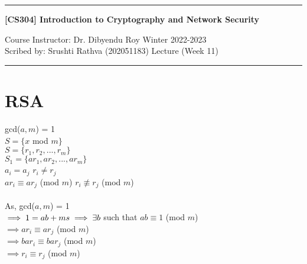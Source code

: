 \documentclass[11pt]{article}
\begin{document}
\noindent
\rule{\textwidth}{1pt}
\begin{center}
{\bf [CS304] Introduction to Cryptography and Network Security}
\end{center}
Course Instructor: Dr. Dibyendu Roy \hfill Winter 2022-2023 \\
Scribed by: Srushti Rathva (202051183) \hfill Lecture (Week 11) \\
\rule{\textwidth}{1pt}

\section*{RSA}
gcd($a,m$) = 1 \\
$S = \{x $ mod $m \}$ \\
$S = \{r_{1},r_{2},...,r_{m}\}$ \\
$S_{1} = \{ar_{1},ar_{2},...,ar_{m}\}$ \\
$a_{i} = a_{j}$ \hspace*{3cm}$r_{i} \neq r_{j}$ \\
$ar_{i} \equiv ar_{j}$ (mod $m$)  \hspace*{1cm}$r_{i} \not\equiv r_{j}$ (mod $m$) \\\\
As, gcd($a,m$) = 1 \\
$\implies 1 = ab + ms \\
\implies \exists b$ such that $ab \equiv 1$ (mod $m$) \\
$\implies ar_{i} \equiv ar_{j}$ (mod $m$) \\
$\implies bar_{i} \equiv bar_{j}$ (mod $m$) \\
$\implies r_{i} \equiv r_{j}$ (mod $m$) 
\end{document}
